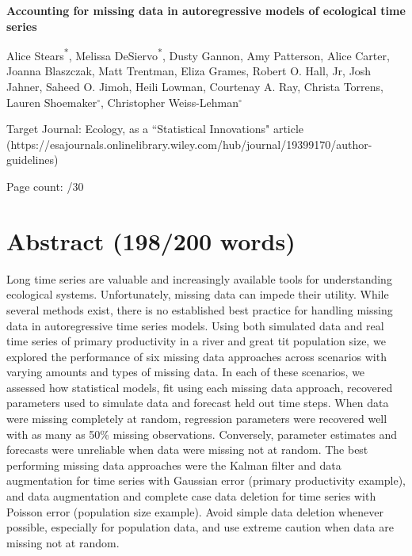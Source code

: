 \documentclass{article}
\begin{document}

{\Large \noindent \bf %
Accounting for missing data in autoregressive models of ecological time series
}

\medskip

\noindent Alice Stears\textsuperscript{*}, 
Melissa DeSiervo\textsuperscript{*},
Dusty Gannon,
Amy Patterson,
Alice Carter,
Joanna Blaszczak,
Matt Trentman,
Eliza Grames,
Robert O. Hall, Jr,
Josh Jahner,
Saheed O. Jimoh,
Heili Lowman, %
Courtenay A. Ray,
Christa Torrens,
Lauren Shoemaker$^{\circ}$,
Christopher Weiss-Lehman$^{\circ}$


\noindent Target Journal: Ecology, as a ``Statistical Innovations" article (https://esajournals.onlinelibrary.wiley.com/hub/journal/19399170/author-guidelines) 

\noindent Page count: \pageref{LastPage}/30

\clearpage


\section*{Abstract (198/200 words)} %
Long time series are valuable and increasingly available tools for understanding ecological systems. Unfortunately, missing data can impede their utility. While several methods exist, there is no established best practice for handling missing data in autoregressive time series models. Using both simulated data and real time series of primary productivity in a river and great tit population size, we explored the performance of six missing data approaches across scenarios with varying amounts and types of missing data. In each of these scenarios, we assessed how statistical models, fit using each missing data approach, recovered parameters used to simulate data and forecast held out time steps. When data were missing completely at random, regression parameters were recovered well with as many as 50\% missing observations. Conversely, parameter estimates and forecasts were unreliable when data were missing not at random. The best performing missing data approaches were the Kalman filter and data augmentation for time series with Gaussian error (primary productivity example), and data augmentation and complete case data deletion for time series with Poisson error (population size example). Avoid simple data deletion whenever possible, especially for population data, and use extreme caution when data are missing not at random.
\end{document}
